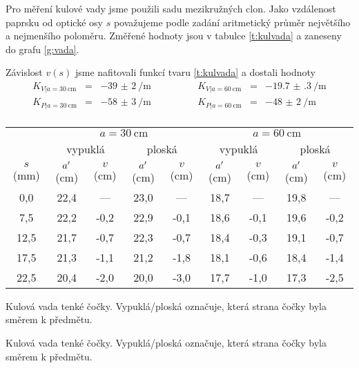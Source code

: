 Pro měření kulové vady jsme použili sadu mezikružných clon. Jako vzdálenost paprsku od optické osy $s$ považujeme podle zadání aritmetický průměr největšího a nejmenšího poloměru.
Změřené hodnoty jsou v tabulce \ref{t:kulvada} a zaneseny do grafu \ref{g:vada}.


Závislost $v(s)$ jsme nafitovali funkcí tvaru \eqref{t:kulvada} a dostali hodnoty
\begin{equation} \label{e:vysledky}
\begin{array}{rclrcl}
K_{V | a=\SI{30}{\cm}} & = & \SI{-39(2)}{\per\metre} \qquad \qquad & K_{V | a=\SI{60}{\cm}} & = & \SI{-19.7(3)}{\per\metre} \\
K_{P | a=\SI{30}{\cm}} & = &\SI{-58(3)}{\per\metre} \qquad \qquad & K_{P | a=\SI{60}{\cm}} & = & \SI{-48(2)}{\per\metre} \\
\end{array}
\end{equation}

\begin{tabulka}[htbp]
\centering
\begin{tabular}{c|cc|cc||cc|cc}
& \multicolumn{4}{c||}{$a = \SI{30}{\cm}$} & \multicolumn{4}{c}{$a = \SI{60}{\cm}$} \\
& \multicolumn{2}{c|}{vypuklá} & \multicolumn{2}{c||}{ploská} & \multicolumn{2}{c|}{vypuklá} & \multicolumn{2}{c}{ploská} \\
$s$ (\si{\mm}) & $a^\prime$ (\si{\cm}) & $v$ (\si{\cm}) & $a^\prime$ (\si{\cm}) & $v$ (\si{\cm}) & $a^\prime$ (\si{\cm}) & $v$ (\si{\cm}) & $a^\prime$ (\si{\cm}) & $v$ (\si{\cm}) \\ \hline
0,0 & 22,4 & --- & 23,0 & --- & 18,7 & --- & 19,8 & --- \\ 
7,5 & 22,2 & -0,2 & 22,9 & -0,1 & 18,6 & -0,1 & 19,6 & -0,2 \\ 
12,5 & 21,7 & -0,7 & 22,3 & -0,7 & 18,4 & -0,3 & 19,1 & -0,7 \\ 
17,5 & 21,3 & -1,1 & 21,2 & -1,8 & 18,1 & -0,6 & 18,4 & -1,4 \\ 
22,5 & 20,4 & -2,0 & 20,0 & -3,0 & 17,7 & -1,0 & 17,3 & -2,5 \\ 
\end{tabular}
\caption{Kulová vada tenké čočky. Vypuklá/ploská označuje, která strana čočky byla směrem k předmětu.}
\label{t:kulvada}
\end{tabulka}

\begin{graph}[htbp] 
\centering

\caption{Kulová vada tenké čočky. Vypuklá/ploská označuje, která strana čočky byla směrem k předmětu.}
\label{g:vada}
\end{graph}




